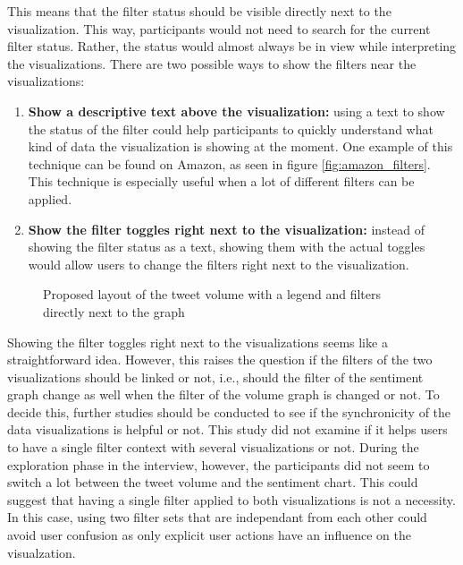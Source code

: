 This means that the filter status should be visible directly next to the visualization. This way, participants would not need to search for the current filter status. Rather, the status would almost always be in view while interpreting the visualizations. There are two possible ways to show the filters near the visualizations:
\begin{enumerate}
    \item \textbf{Show a descriptive text above the visualization:} using a text to show the status of the filter could help participants to quickly understand what kind of data the visualization is showing at the moment. One example of this technique can be found on Amazon, as seen in figure \ref{fig:amazon_filters}. This technique is especially useful when a lot of different filters can be applied.
    \item \textbf{Show the filter toggles right next to the visualization:} instead of showing the filter status as a text, showing them with the actual toggles would allow users to change the filters right next to the visualization.
\end{enumerate}

\begin{figure}[h!tbp]
    \caption{Proposed layout of the tweet volume with a legend and filters directly next to the graph}
    \label{fig:legend_and_filters}
\end{figure}

Showing the filter toggles right next to the visualizations seems like a straightforward idea. However, this raises the question if the filters of the two visualizations should be linked or not, i.e., should the filter of the sentiment graph change as well when the filter of the volume graph is changed or not. To decide this, further studies should be conducted to see if the synchronicity of the data visualizations is helpful or not. This study did not examine if it helps users to have a single filter context with several visualizations or not. During the exploration phase in the interview, however, the participants did not seem to switch a lot between the tweet volume and the sentiment chart. This could suggest that having a single filter applied to both visualizations is not a necessity. In this case, using two filter sets that are independant from each other could avoid user confusion as only explicit user actions have an influence on the visualzation.


